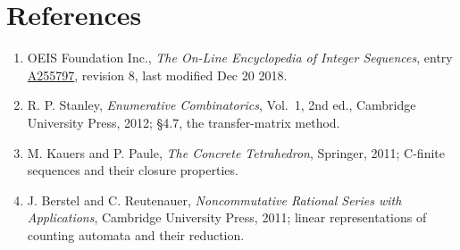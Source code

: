 \documentclass[11pt]{article}
\theoremstyle{definition}
\begin{document}
\section{References}

\begin{enumerate}

\item OEIS Foundation Inc., \emph{The On-Line Encyclopedia of Integer Sequences}, entry \href{https://oeis.org/A255797}{A255797}, revision 8, last modified Dec 20 2018.

\item R. P. Stanley, \emph{Enumerative Combinatorics}, Vol.~1, 2nd ed., Cambridge University Press, 2012; \S4.7, the transfer-matrix method.

\item M. Kauers and P. Paule, \emph{The Concrete Tetrahedron}, Springer, 2011; C-finite sequences and their closure properties.

\item J. Berstel and C. Reutenauer, \emph{Noncommutative Rational Series with Applications}, Cambridge University Press, 2011; linear representations of counting automata and their reduction.

\end{enumerate}
\end{document}
